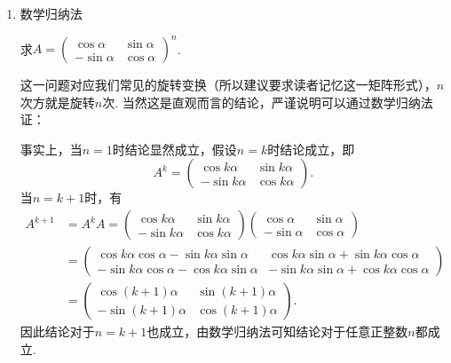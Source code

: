 \begin{enumerate}
    \item 数学归纳法
          \begin{example}
              求$A=\begin{pmatrix}\cos\alpha & \sin\alpha \\ -\sin\alpha & \cos\alpha\end{pmatrix}^n$.
          \end{example}
          这一问题对应我们常见的旋转变换（所以建议要求读者记忆这一矩阵形式），$n$次方就是旋转$n$次. 当然这是直观而言的结论，严谨说明可以通过数学归纳法证：

          \begin{solution}
            事实上，当$n=1$时结论显然成立，假设$n=k$时结论成立，即
            \[A^k=\begin{pmatrix}\cos k\alpha & \sin k\alpha \\ -\sin k\alpha & \cos k\alpha\end{pmatrix}.\]
            当$n=k+1$时，有
            \begin{align*}
                A^{k+1}&=A^kA=\begin{pmatrix}\cos k\alpha & \sin k\alpha \\ -\sin k\alpha & \cos k\alpha\end{pmatrix}\begin{pmatrix}\cos\alpha & \sin\alpha \\ -\sin\alpha & \cos\alpha\end{pmatrix} \\
                &=\begin{pmatrix}\cos k\alpha\cos\alpha-\sin k\alpha\sin\alpha & \cos k\alpha\sin\alpha+\sin k\alpha\cos\alpha \\ -\sin k\alpha\cos\alpha-\cos k\alpha\sin\alpha & -\sin k\alpha\sin\alpha+\cos k\alpha\cos\alpha\end{pmatrix} \\
                &=\begin{pmatrix}\cos(k+1)\alpha & \sin(k+1)\alpha \\ -\sin(k+1)\alpha & \cos(k+1)\alpha\end{pmatrix}.
            \end{align*}
            因此结论对于$n=k+1$也成立，由数学归纳法可知结论对于任意正整数$n$都成立.
          \end{solution}


\end{enumerate}
